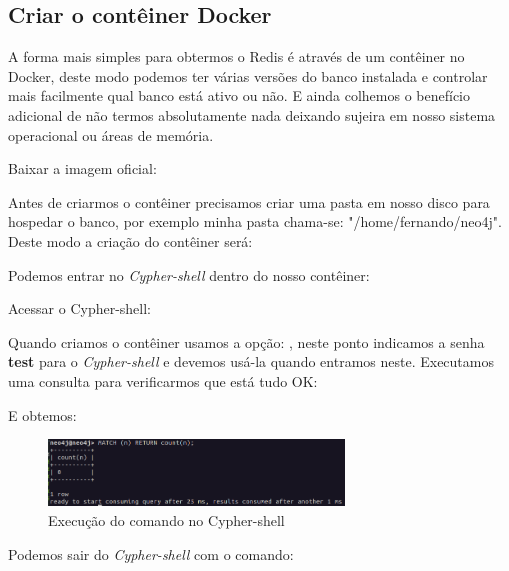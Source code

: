 \documentclass[a4paper,11pt]{article}
\begin{document}
\subsection{Criar o contêiner Docker}
A forma mais simples para obtermos o Redis é através de um contêiner no Docker, deste modo podemos ter várias versões do banco instalada e controlar mais facilmente qual banco está ativo ou não. E ainda colhemos o benefício adicional de não termos absolutamente nada deixando sujeira em nosso sistema operacional ou áreas de memória.

Baixar a imagem oficial: \\

Antes de criarmos o contêiner precisamos criar uma pasta em nosso disco para hospedar o banco, por exemplo minha pasta chama-se: "/home/fernando/neo4j". Deste modo a criação do contêiner será: \\

Podemos entrar no \textit{Cypher-shell} dentro do nosso contêiner: \\

Acessar o Cypher-shell: \\

Quando criamos o contêiner usamos a opção: , neste ponto indicamos a senha \textbf{test} para o \textit{Cypher-shell} e devemos usá-la quando entramos neste. Executamos uma consulta para verificarmos que está tudo OK: \\

E obtemos:
\begin{figure}[H]
	\centering
	\includegraphics[width=0.7\textwidth]{imagens/cyphershell}
	\caption{Execução do comando no Cypher-shell}
\end{figure}

Podemos sair do \textit{Cypher-shell} com o comando: \\
\end{document}
